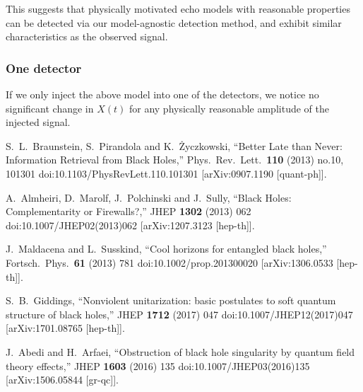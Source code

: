 \documentclass[12pt]{article}
\begin{document}
This suggests that physically motivated echo models with reasonable properties can be detected via our model-agnostic detection method, and exhibit similar characteristics as the observed signal. 



\subsubsection{One detector}
If we only inject the above model into one of the detectors, we notice no significant change in $X(t)$ for any physically reasonable amplitude of the injected signal.





\begin{thebibliography}{99}

  S.~L.~Braunstein, S.~Pirandola and K.~Życzkowski,
  ``Better Late than Never: Information Retrieval from Black Holes,''
  Phys.\ Rev.\ Lett.\  {\bf 110} (2013) no.10,  101301
  doi:10.1103/PhysRevLett.110.101301
  [arXiv:0907.1190 [quant-ph]].
  
  A.~Almheiri, D.~Marolf, J.~Polchinski and J.~Sully,
  ``Black Holes: Complementarity or Firewalls?,''
  JHEP {\bf 1302} (2013) 062
  doi:10.1007/JHEP02(2013)062
  [arXiv:1207.3123 [hep-th]].
  
  J.~Maldacena and L.~Susskind,
  ``Cool horizons for entangled black holes,''
  Fortsch.\ Phys.\  {\bf 61} (2013) 781
  doi:10.1002/prop.201300020
  [arXiv:1306.0533 [hep-th]].
  
  S.~B.~Giddings,
  ``Nonviolent unitarization: basic postulates to soft quantum structure of black holes,''
  JHEP {\bf 1712} (2017) 047
  doi:10.1007/JHEP12(2017)047
  [arXiv:1701.08765 [hep-th]].

  J.~Abedi and H.~Arfaei,
  ``Obstruction of black hole singularity by quantum field theory effects,''
  JHEP {\bf 1603} (2016) 135
  doi:10.1007/JHEP03(2016)135
  [arXiv:1506.05844 [gr-qc]].


\end{thebibliography}
\end{document}
